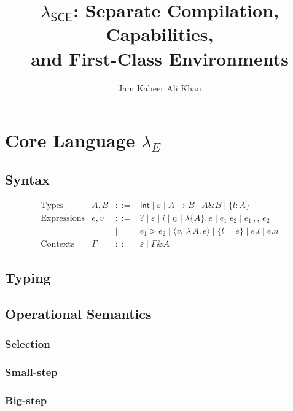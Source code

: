 \documentclass{article}
\title{$\lambda_{\mathsf{SCE}}$: Separate Compilation, Capabilities,\\and First-Class Environments}
\author{Jam Kabeer Ali Khan}
\date{}
\newcommand{\fatcomma}{\mathbin{\,{,}{,}\,}}
\newcommand{\tand}{\mathbin{\&}}
\newcommand{\tarr}{\rightarrow}
\newcommand{\kw}[1]{\mathsf{#1}}
\newcommand{\query}{\textsf{?}}
\newcommand{\cclos}[3]{\langle #1,\,\lambda\,#2.\,#3 \rangle}
\begin{document}
\maketitle

\section{Core Language $\lambda_E$}

\subsection{Syntax}

\[
\begin{array}{lrcl}
\text{Types}    & A, B & ::= & \kw{Int} \mid \varepsilon \mid A \tarr B \mid A \tand B \mid \{l : A\} \\[4pt]
\text{Expressions} & e, v & ::= &
    \query \mid \varepsilon \mid i \mid \underline{n}
    \mid \lambda\{A\}.\,e
    \mid e_1\;e_2
    \mid e_1 \fatcomma e_2 \\
  & & \mid & e_1 \triangleright e_2
    \mid \cclos{v}{A}{e}
    \mid \{l = e\}
    \mid e.l
    \mid e.n \\[4pt]
\text{Contexts}  & \Gamma & ::= & \varepsilon \mid \Gamma \tand A
\end{array}
\]

\subsection{Typing}
\ottdefnTyping{}

\subsection{Operational Semantics}

\subsubsection*{Selection}
\ottdefnsel{}

\subsubsection*{Small-step}
\ottdefnstep{}

\subsubsection*{Big-step}
\ottdefnbstep{}
\end{document}

